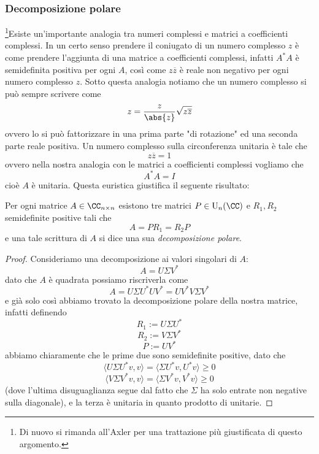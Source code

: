 \documentclass[11pt]{scrartcl}
\begin{document}
   	 \subsubsection{Decomposizione polare}
   	 \footnote{Di nuovo si rimanda all'Axler per una trattazione più giustificata di questo argomento.}Esiste un'importante analogia tra numeri complessi e matrici a coefficienti complessi. In un certo senso prendere il coniugato di un numero complesso $z$ è come prendere l'aggiunta di una matrice a coefficienti complessi, infatti $A^*A$ è semidefinita positiva per ogni $A$, così come $z\overline{z}$ è reale non negativo per ogni numero complesso $z$. Sotto questa analogia notiamo che un numero complesso si può sempre scrivere come
   	 $$z=\frac{z}{\abs{z}}\sqrt{z\overline{z}}$$
   	 ovvero lo si può fattorizzare in una prima parte "di rotazione" ed una seconda parte reale positiva. Un numero complesso sulla circonferenza unitaria è tale che 
   	 $$z\overline{z}=1$$
   	 ovvero nella nostra analogia con le matrici a coefficienti complessi vogliamo che
   	 $$A^*A=I$$
   	 cioè $A$ è unitaria. Questa euristica giustifica il seguente risultato:
   	 \begin{theorem}
   	 	Per ogni matrice $A\in \CC_{n\times n}$ esistono tre matrici $P\in \text{U}_n(\CC)$ e $R_1,R_2$ semidefinite positive tali che
   	 	$$A=PR_1=R_2P$$
   	 	e una tale scrittura di $A$ si dice una sua \textit{decomposizione polare}.
   	 \end{theorem}
   	 \begin{proof}
   	 	Consideriamo una decomposizione ai valori singolari di $A$:
   	 	$$A=U\Sigma V^*$$
   	 	dato che $A$ è quadrata possiamo riscriverla come
   	 	$$A=U\Sigma U^*UV^*=UV^*V\Sigma V^*$$
   	 	e già solo così abbiamo trovato la decomposizione polare della nostra matrice, infatti definendo
   	 	$$R_1:=U\Sigma U^*$$
   	 	$$R_2:=V\Sigma V^*$$
   	 	$$P:=UV^*$$
   	 	abbiamo chiaramente che le prime due sono semidefinite positive, dato che
   	 	$$\langle U\Sigma U^*v,v\rangle=\langle \Sigma U^*v,U^*v\rangle \ge 0$$
   	 	$$\langle V\Sigma V^*v,v\rangle=\langle \Sigma V^*v,V^*v\rangle \ge 0$$
   	 	(dove l'ultima disuguaglianza segue dal fatto che $\Sigma$ ha solo entrate non negative sulla diagonale), e la terza è unitaria in quanto prodotto di unitarie.
   	 \end{proof}
\end{document}
